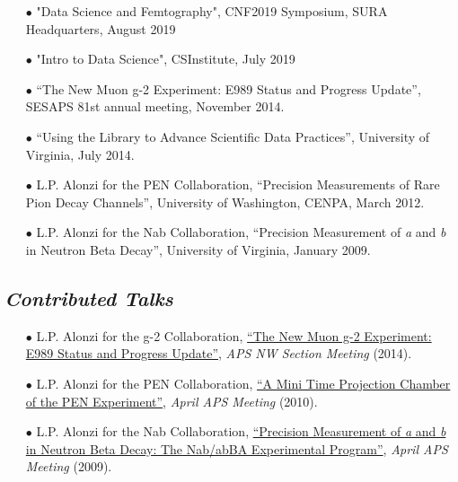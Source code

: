 \documentclass{article}[10pt]
\begin{document}
\begin{itemize}
\item [$\bullet$] "Data Science and Femtography", CNF2019 Symposium, SURA Headquarters, August 2019
\item [$\bullet$] "Intro to Data Science", CSInstitute, July 2019
\item [$\bullet$] ``The New Muon g-2 Experiment: E989 Status and Progress Update'', SESAPS 81st annual meeting, November 2014.
\item [$\bullet$] ``Using the Library to Advance Scientific Data Practices'', University of Virginia, July 2014.
\item [$\bullet$] L.P. Alonzi for the PEN Collaboration, ``Precision Measurements of Rare Pion Decay Channels'', University of Washington, CENPA, March 2012.
\item [$\bullet$] L.P. Alonzi for the Nab Collaboration, ``Precision Measurement of \emph{a} and \emph{b} in Neutron Beta Decay'', University of Virginia, January 2009.
\end{itemize}

\subsection*{\emph{Contributed Talks}}
\begin{itemize}
\item [$\bullet$] L.P. Alonzi for the g-2 Collaboration, \href{http://pen.phys.virginia.edu/lpa2a-docs/2014-05-02-Alonzi-APSNWSection.pdf}{``The New Muon g-2 Experiment: E989 Status and Progress Update''}, \emph{APS NW Section Meeting} (2014).
\item [$\bullet$] L.P. Alonzi for the PEN Collaboration, \href{http://pen.phys.virginia.edu/talks/2010_April_APS_alonzi.pdf}{``A Mini Time Projection Chamber of the PEN Experiment''}, \emph{April APS Meeting} (2010).
\item [$\bullet$] L.P. Alonzi for the Nab Collaboration, \href{http://nab.phys.virginia.edu/slides/2009_April_APS_Alonzi.pdf}{``Precision Measurement of \emph{a} and \emph{b} in Neutron Beta Decay: The Nab/abBA Experimental Program''}, \emph{April APS Meeting} (2009).
\end{itemize}
\end{document}
